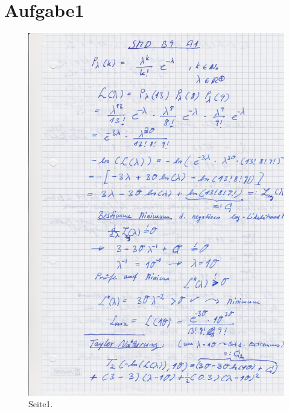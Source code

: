 \section{Aufgabe1}
\label{sec:a1}
\begin{figure}
  \includegraphics[width=\textwidth]{blatt9p1.jpg}
  \caption{Seite1.}
  \label{fig1}
\end{figure}

